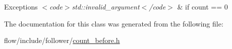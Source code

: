 \begin{DoxyExceptions}{Exceptions}
{\em $<$code$>$std\+::invalid\+\_\+argument$<$/code$>$} & if {\ttfamily count == 0} \\
\hline
\end{DoxyExceptions}


The documentation for this class was generated from the following file\+:\begin{DoxyCompactItemize}
\item 
flow/include/follower/\hyperlink{count__before_8h}{count\+\_\+before.\+h}\end{DoxyCompactItemize}
